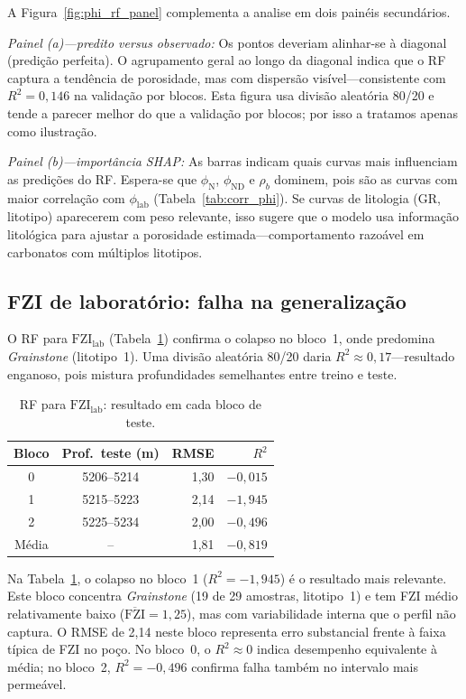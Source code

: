 \documentclass[11pt,a4paper]{article}
\newcommand{\philab}{\ensuremath{\phi_{\mathrm{lab}}}}
\newcommand{\fzilab}{\ensuremath{\mathrm{FZI}_{\mathrm{lab}}}}
\newcommand{\phiND}{\ensuremath{\phi_{\mathrm{ND}}}}
\newcommand{\phiN}{\ensuremath{\phi_{\mathrm{N}}}}
\begin{document}
A Figura~\ref{fig:phi_rf_panel} complementa a analise em dois painéis
secundários.

\emph{Painel (a)---predito versus observado:}
Os pontos deveriam alinhar-se à diagonal (predição perfeita).
O agrupamento geral ao longo da diagonal indica que o RF captura a tendência
de porosidade, mas com dispersão visível---consistente com $R^2 = 0{,}146$
na validação por blocos.
Esta figura usa divisão aleatória 80/20 e tende a parecer melhor do que a
validação por blocos; por isso a tratamos apenas como ilustração.

\emph{Painel (b)---importância SHAP:}
As barras indicam quais curvas mais influenciam as predições do RF.
Espera-se que \phiN{}, \phiND{} e $\rho_b$
dominem, pois são as curvas com maior correlação com \philab{}
(Tabela~\ref{tab:corr_phi}).
Se curvas de litologia (GR, litotipo) aparecerem com peso relevante, isso
sugere que o modelo usa informação litológica para ajustar a porosidade
estimada---comportamento razoável em carbonatos com múltiplos litotipos.

\subsection{FZI de laboratório: falha na generalização}

O RF para \fzilab{} (Tabela~\ref{tab:fzi_folds}) confirma o
colapso no bloco~1, onde predomina \emph{Grainstone} (litotipo~1).
Uma divisão aleatória 80/20 daria $R^2 \approx 0{,}17$---resultado
enganoso, pois mistura profundidades semelhantes entre treino e teste.

\begin{table}[H]
  \centering
  \caption{RF para \fzilab{}: resultado em cada bloco de teste.}
  \label{tab:fzi_folds}
  \begin{tabular}{ccrr}
    \toprule
    Bloco & Prof.\ teste (m) & RMSE & $R^2$ \\
    \midrule
    0 & 5206--5214 & 1,30 & $-0{,}015$ \\
    1 & 5215--5223 & 2,14 & $-1{,}945$ \\
    2 & 5225--5234 & 2,00 & $-0{,}496$ \\
    \midrule
    Média & -- & 1,81 & $-0{,}819$ \\
    \bottomrule
  \end{tabular}
\end{table}

Na Tabela~\ref{tab:fzi_folds}, o colapso no bloco~1 ($R^2 = -1{,}945$) é o resultado mais relevante.
Este bloco concentra \emph{Grainstone} (19 de 29 amostras, litotipo~1) e tem FZI médio
relativamente baixo ($\overline{\mathrm{FZI}} = 1{,}25$), mas com variabilidade
interna que o perfil não captura.
O RMSE de 2,14 neste bloco representa erro substancial frente à faixa típica
de FZI no poço.
No bloco~0, o $R^2 \approx 0$ indica desempenho equivalente à média; no
bloco~2, $R^2 = -0{,}496$ confirma falha também no intervalo mais permeável.
\end{document}

